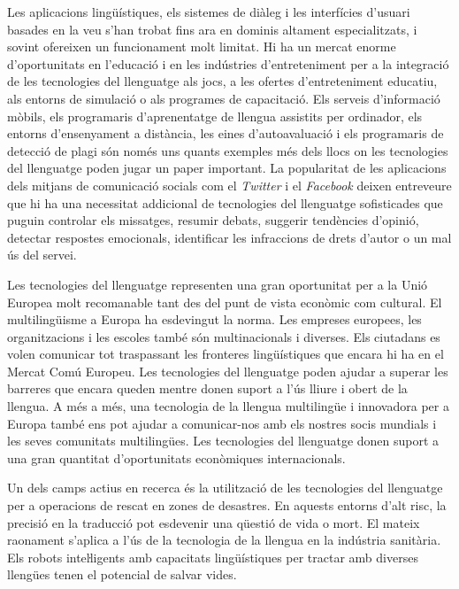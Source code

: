\documentclass[]{../../metanetpaper}
\begin{document}
\begin{multicols}{2}
Les aplicacions lingüístiques, els sistemes de diàleg i les interfícies d’usuari basades en la veu s’han trobat fins ara en dominis altament especialitzats, i sovint ofereixen un funcionament molt limitat. Hi ha un mercat enorme d’oportunitats en l’educació i en les indústries d’entre\-te\-ni\-ment per a la integració de les tecnologies del llenguatge als jocs, a les ofertes d'entre\-te\-ni\-ment educatiu, als entorns de simulació o als programes de capacitació. Els serveis d’informació mòbils, els programaris d’aprenentatge de llengua assistits per ordinador, els entorns d’ensenyament a distància, les eines d’autoavaluació i els programaris de detecció de plagi són només uns quants exemples més dels llocs on les tecnologies del llenguatge poden jugar un paper important. La popularitat de les aplicacions dels mitjans de comunicació socials com el \textit{Twitter} i el \textit{Facebook} deixen entreveure que hi ha una necessitat addicional de tecnologies del llenguatge sofisticades que puguin controlar els missatges, resumir debats, suggerir tendències d’opinió, detectar respostes emocionals, identificar les infraccions de drets d’autor o un mal ús del servei. 

Les tecnologies del llenguatge representen una gran oportunitat per a la Unió Europea molt recomanable tant des del punt de vista econòmic com cultural.  El multilingüisme a Europa ha esdevingut la norma.  Les empreses europees, les organitzacions i les escoles també són multinacionals i diverses. Els ciutadans es volen comunicar tot traspassant les fronteres lingüístiques que encara hi ha en el Mercat Comú Europeu. Les tecnologies del llenguatge poden ajudar a superar les barreres que encara queden mentre donen suport a l’ús lliure i obert de la llengua. A més a més, una tecnologia de la llengua multilingüe i innovadora per a Europa també ens pot ajudar a comunicar-nos amb els nostres socis mundials i les seves comunitats multilingües. Les tecnologies del llenguatge donen suport a una gran quantitat d’oportunitats econòmiques internacionals.

Un dels camps actius en recerca és la utilització de les tecnologies del llenguatge per a operacions de rescat en zones de desastres. En aquests entorns d’alt risc, la precisió en la traducció pot esdevenir una qüestió de vida o mort. El mateix raonament s’aplica a l’ús de la tecnologia de la llengua en la indústria sanitària. Els robots inteŀligents amb capacitats lingüístiques per tractar amb diverses llengües tenen el potencial de salvar vides. 


\end{multicols}
\end{document}
